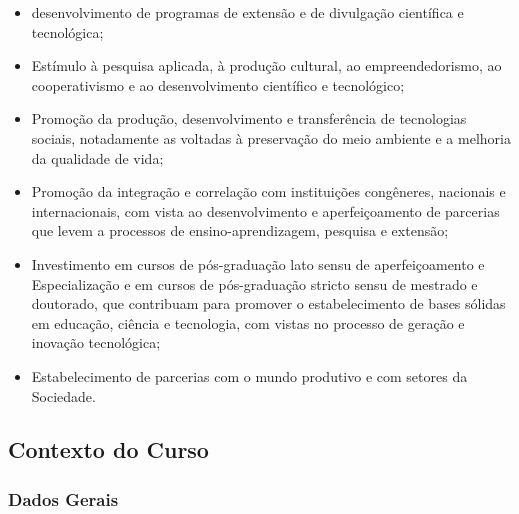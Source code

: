 \begin{itemize}
\item desenvolvimento de programas de extensão e de divulgação científica e tecnológica;

\item Est\'imulo \`a pesquisa aplicada, \`a produção cultural, ao empreendedorismo, ao cooperativismo e ao desenvolvimento científico e tecnológico;

\item Promo\c{c}\~ao da produção, desenvolvimento e transferência de tecnologias sociais, notadamente as voltadas à preservação do meio ambiente e a melhoria da qualidade de vida;

\item Promo\c{c}\~ao da integração e correlação com instituições congêneres, nacionais e internacionais, com vista ao desenvolvimento e aperfeiçoamento de parcerias que levem a processos de ensino-aprendizagem, pesquisa e extensão;

\item Investimento em cursos de pós-graduação lato sensu de aperfeiçoamento e Especialização e em cursos de pós-graduação stricto sensu de mestrado e doutorado, que contribuam para promover o estabelecimento de bases sólidas em educação, ciência e tecnologia, com vistas no processo de geração e inovação tecnológica;

\item Estabelecimento de parcerias com o mundo produtivo e com setores da Sociedade.

\end{itemize}

\subsection{Contexto do Curso}


\subsubsection{Dados Gerais}

